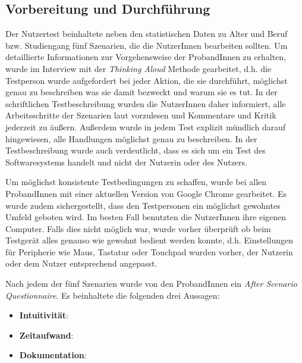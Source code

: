 \subsection{Vorbereitung und Durchführung}

Der Nutzertest beinhaltete neben den statistischen Daten zu Alter und Beruf bzw. Studiengang fünf Szenarien, die die NutzerInnen bearbeiten sollten. Um detaillierte Informationen zur Vorgehensweise der ProbandInnen zu erhalten, wurde im Interview mit der \textit{Thinking Aloud} Methode gearbeitet, d.h. die Testperson wurde aufgefordert bei jeder Aktion, die sie durchführt, möglichst genau zu beschreiben was sie damit bezweckt und warum sie es tut\cite{Nielsen1993}. In der schriftlichen Testbeschreibung wurden die NutzerInnen daher informiert, alle Arbeitsschritte der Szenarien laut vorzulesen und Kommentare und Kritik jederzeit zu äußern. Außerdem wurde in jedem Test explizit mündlich darauf hingewiesen, alle Handlungen möglichst genau zu beschreiben. In der Testbeschreibung wurde auch verdeutlicht, dass es sich um ein Test des Softwaresystems handelt und nicht der Nutzerin oder des Nutzers.

Um möglichst konsistente Testbedingungen zu schaffen, wurde bei allen ProbandInnen mit einer aktuellen Version von Google Chrome gearbeitet. Es wurde zudem sichergestellt, dass den Testpersonen ein möglichst gewohntes Umfeld geboten wird. Im besten Fall benutzten die NutzerInnen ihre eigenen Computer. Falls dies nicht möglich war, wurde vorher überprüft ob beim Testgerät alles genauso wie gewohnt bedient werden konnte, d.h. Einstellungen für Peripherie wie Maus, Tastatur oder Touchpad wurden vorher, der Nutzerin oder dem Nutzer entsprechend angepasst.

Nach jedem der fünf Szenarien wurde von den ProbandInnen ein \textit{After Scenario Questionnaire}\cite{Lewis1995}. Es beinhaltete die folgenden drei Aussagen:
\begin{itemize}
	\item \textbf{Intuitivität}: 
	\item \textbf{Zeitaufwand}: 
	\item \textbf{Dokumentation}: 
\end{itemize}

